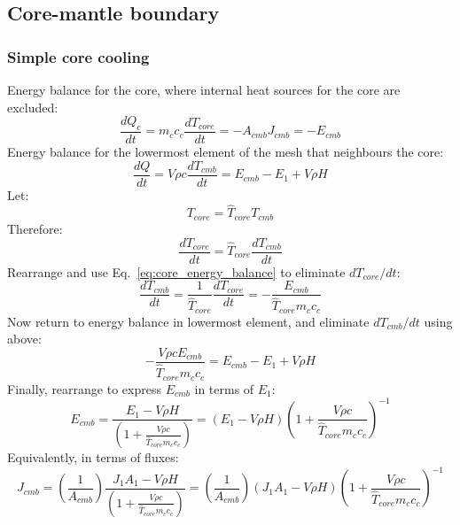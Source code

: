 \subsection{Core-mantle boundary}
\subsubsection{Simple core cooling}
Energy balance for the core, where internal heat sources for the core are excluded:
\begin{equation}
\frac{dQ_c}{dt} = m_c c_c \frac{dT_{core}}{dt} = -A_{cmb} J_{cmb} = -E_{cmb}
\label{eq:core_energy_balance}
\end{equation}
Energy balance for the lowermost element of the mesh that neighbours the core:
\begin{equation}
\frac{dQ}{dt}= V \rho c \frac{dT_{cmb}}{dt} = E_{cmb} - E_1 + V \rho H 
\end{equation}
Let:
\begin{equation}
T_{core} = \hat{T}_{core} T_{cmb}
\end{equation}
Therefore:
\begin{equation}
\frac{dT_{core}}{dt} = \hat{T}_{core} \frac{dT_{cmb}}{dt}
\end{equation}
Rearrange and use Eq.~\ref{eq:core_energy_balance} to eliminate $dT_{core}/dt$:
\begin{equation}
\frac{dT_{cmb}}{dt} = \frac{1}{\hat{T}_{core}} \frac{dT_{core}}{dt} = -\frac{E_{cmb}}{\hat{T}_{core} m_c c_c}
\end{equation}
Now return to energy balance in lowermost element, and eliminate $dT_{cmb}/dt$ using above:
\begin{equation}
- \frac{V \rho c E_{cmb}}{\hat{T}_{core} m_c c_c} = E_{cmb} - E_1 + V \rho H 
\end{equation}
Finally, rearrange to express $E_{cmb}$ in terms of $E_1$:
\begin{equation}
E_{cmb} = \frac{E_1 - V \rho H}{\left(1+\frac{V \rho c}{\hat{T}_{core} m_c c_c}\right)} = (E_1 - V \rho H)\left(1+\frac{V \rho c}{\hat{T}_{core} m_c c_c}\right)^{-1}
\end{equation}
Equivalently, in terms of fluxes:
\begin{equation}
J_{cmb} = \left( \frac{1}{A_{cmb}} \right) \frac{J_1A_1 - V \rho H}{\left(1+\frac{V \rho c}{\hat{T}_{core} m_c c_c}\right)} = \left( \frac{1}{A_{cmb}} \right) (J_1A_1 - V \rho H)\left(1+\frac{V \rho c}{\hat{T}_{core} m_c c_c}\right)^{-1}
\end{equation}
